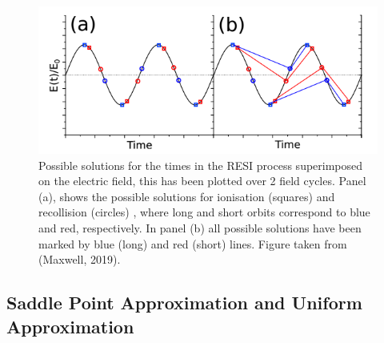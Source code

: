 \documentclass[11pt]{article}
\numberwithin{equation}{section}
\begin{document}
\begin{figure}[!htb]
    \centering
    \includegraphics[width=12cm]{Figures/longshortOrbits.png}
    \caption{Possible solutions for the times in the RESI process superimposed on the electric field, this has been plotted over 2 field cycles. Panel (a), shows the possible solutions for ionisation (squares) and recollision (circles) , where long and short orbits correspond to blue and red, respectively. In panel (b) all possible solutions have been marked by blue (long) and red (short) lines. Figure taken from (Maxwell, 2019)\cite{maxwell_2019_strongfield}.}
    \label{fig:long_short}
\end{figure}

\subsection{Saddle Point Approximation and Uniform Approximation}
\end{document}

